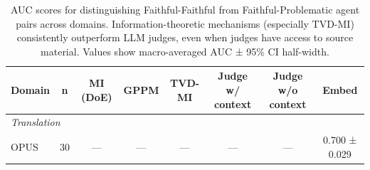 \begin{table}[t]
\centering
\caption{AUC scores for distinguishing Faithful-Faithful from Faithful-Problematic agent pairs across domains. Information-theoretic mechanisms (especially TVD-MI) consistently outperform LLM judges, even when judges have access to source material. Values show macro-averaged AUC ± 95\% CI half-width.}
\label{tab:auc_results}
\begin{tabular}{lccccccc}
\toprule
\textbf{Domain} & \textbf{n} & \textbf{MI (DoE)} & \textbf{GPPM} & \textbf{TVD-MI} & \textbf{Judge w/ context} & \textbf{Judge w/o context} & \textbf{Embed} \\
\midrule
\multicolumn{8}{l}{\textit{Translation}} \\
OPUS & 30 & — & — & — & — & — & 0.700 ± 0.029 \\
\midrule
\bottomrule
\end{tabular}
\end{table}